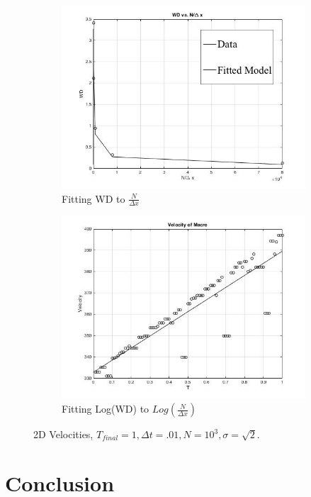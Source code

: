 \documentclass[10pt]{article}
\begin{document}
\begin{figure}[H]
\centering
\begin{subfigure}{.5\textwidth}
  \centering
  \includegraphics[width=.9\linewidth]{WDVSNDX.jpg}
  \caption{Fitting WD to $\frac{N}{\Delta x}$}
  \label{fig:Fitting2DMicroVelocity}
\end{subfigure}%
\begin{subfigure}{.5\textwidth}
  \centering
  \includegraphics[width=.9\linewidth]{2DMacroVelocity.jpg}
  \caption{Fitting Log(WD) to $Log(\frac{N}{\Delta x})$}
  \label{fig: Fitting2DMacroVelocity}
\end{subfigure}
\caption{2D Velocities, $T_{final} = 1, \Delta t = .01, N = 10^3, \sigma = \sqrt{2}.$}
\label{fig:test}
\end{figure}



\section{Conclusion}
\label{sec: Conclusion}
\end{document}
